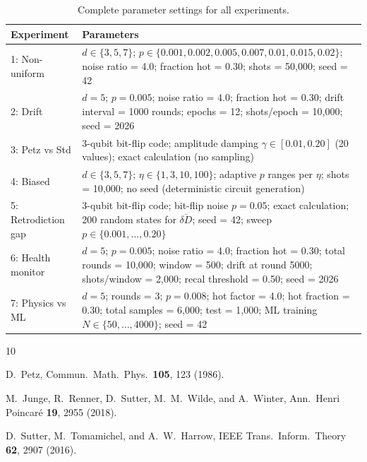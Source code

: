 \documentclass[12pt]{article}
\newcommand{\dd}{\delta\!D}
\begin{document}
\begin{table}[h]
\centering
\caption{Complete parameter settings for all experiments.}
\small
\begin{tabular}{p{2.5cm}p{10cm}}
\toprule
\textbf{Experiment} & \textbf{Parameters} \\
\midrule
1: Non-uniform & $d \in \{3,5,7\}$; $p \in \{0.001, 0.002, 0.005, 0.007, 0.01, 0.015, 0.02\}$; noise ratio = 4.0; fraction hot = 0.30; shots = 50,000; seed = 42 \\
\midrule
2: Drift & $d = 5$; $p = 0.005$; noise ratio = 4.0; fraction hot = 0.30; drift interval = 1000 rounds; epochs = 12; shots/epoch = 10,000; seed = 2026 \\
\midrule
3: Petz vs Std & 3-qubit bit-flip code; amplitude damping $\gamma \in [0.01, 0.20]$ (20 values); exact calculation (no sampling) \\
\midrule
4: Biased & $d \in \{3,5,7\}$; $\eta \in \{1, 3, 10, 100\}$; adaptive $p$ ranges per $\eta$; shots = 10,000; no seed (deterministic circuit generation) \\
\midrule
5: Retrodiction gap & 3-qubit bit-flip code; bit-flip noise $p = 0.05$; exact calculation; 200 random states for $\overline{\dd}$; seed = 42; sweep $p \in \{0.001, \ldots, 0.20\}$ \\
\midrule
6: Health monitor & $d = 5$; $p = 0.005$; noise ratio = 4.0; fraction hot = 0.30; total rounds = 10,000; window = 500; drift at round 5000; shots/window = 2,000; recal threshold = 0.50; seed = 2026 \\
\midrule
7: Physics vs ML & $d = 5$; rounds = 3; $p = 0.008$; hot factor = 4.0; hot fraction = 0.30; total samples = 6,000; test = 1,000; ML training $N \in \{50, \ldots, 4000\}$; seed = 42 \\
\bottomrule
\end{tabular}
\end{table}

\begin{thebibliography}{10}

D.~Petz, Commun.\ Math.\ Phys.\ \textbf{105}, 123 (1986).

M.~Junge, R.~Renner, D.~Sutter, M.~M.~Wilde, and A.~Winter,
Ann.\ Henri Poincar\'{e} \textbf{19}, 2955 (2018).

D.~Sutter, M.~Tomamichel, and A.~W.~Harrow,
IEEE Trans.\ Inform.\ Theory \textbf{62}, 2907 (2016).

\end{thebibliography}
\end{document}

